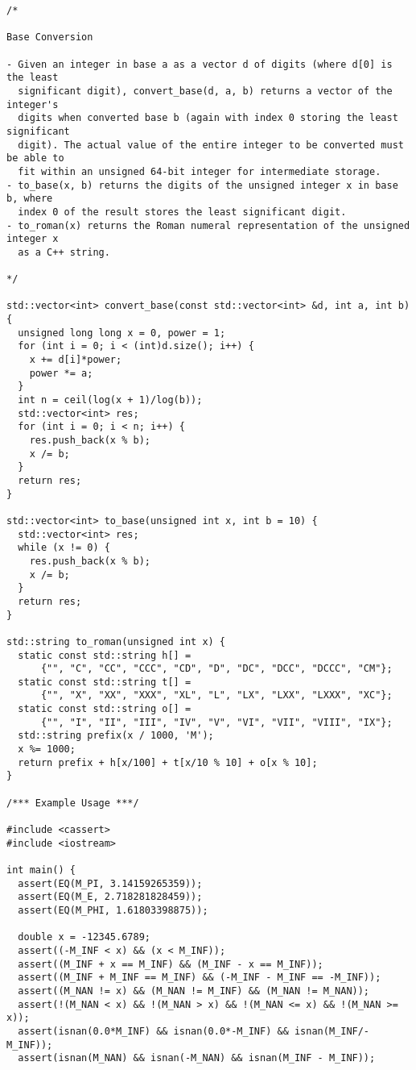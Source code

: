 \begin{lstlisting}
/*

Base Conversion

- Given an integer in base a as a vector d of digits (where d[0] is the least
  significant digit), convert_base(d, a, b) returns a vector of the integer's
  digits when converted base b (again with index 0 storing the least significant
  digit). The actual value of the entire integer to be converted must be able to
  fit within an unsigned 64-bit integer for intermediate storage.
- to_base(x, b) returns the digits of the unsigned integer x in base b, where
  index 0 of the result stores the least significant digit.
- to_roman(x) returns the Roman numeral representation of the unsigned integer x
  as a C++ string.

*/

std::vector<int> convert_base(const std::vector<int> &d, int a, int b) {
  unsigned long long x = 0, power = 1;
  for (int i = 0; i < (int)d.size(); i++) {
    x += d[i]*power;
    power *= a;
  }
  int n = ceil(log(x + 1)/log(b));
  std::vector<int> res;
  for (int i = 0; i < n; i++) {
    res.push_back(x % b);
    x /= b;
  }
  return res;
}

std::vector<int> to_base(unsigned int x, int b = 10) {
  std::vector<int> res;
  while (x != 0) {
    res.push_back(x % b);
    x /= b;
  }
  return res;
}

std::string to_roman(unsigned int x) {
  static const std::string h[] =
      {"", "C", "CC", "CCC", "CD", "D", "DC", "DCC", "DCCC", "CM"};
  static const std::string t[] =
      {"", "X", "XX", "XXX", "XL", "L", "LX", "LXX", "LXXX", "XC"};
  static const std::string o[] =
      {"", "I", "II", "III", "IV", "V", "VI", "VII", "VIII", "IX"};
  std::string prefix(x / 1000, 'M');
  x %= 1000;
  return prefix + h[x/100] + t[x/10 % 10] + o[x % 10];
}

/*** Example Usage ***/

#include <cassert>
#include <iostream>

int main() {
  assert(EQ(M_PI, 3.14159265359));
  assert(EQ(M_E, 2.718281828459));
  assert(EQ(M_PHI, 1.61803398875));

  double x = -12345.6789;
  assert((-M_INF < x) && (x < M_INF));
  assert((M_INF + x == M_INF) && (M_INF - x == M_INF));
  assert((M_INF + M_INF == M_INF) && (-M_INF - M_INF == -M_INF));
  assert((M_NAN != x) && (M_NAN != M_INF) && (M_NAN != M_NAN));
  assert(!(M_NAN < x) && !(M_NAN > x) && !(M_NAN <= x) && !(M_NAN >= x));
  assert(isnan(0.0*M_INF) && isnan(0.0*-M_INF) && isnan(M_INF/-M_INF));
  assert(isnan(M_NAN) && isnan(-M_NAN) && isnan(M_INF - M_INF));


\end{lstlisting}
